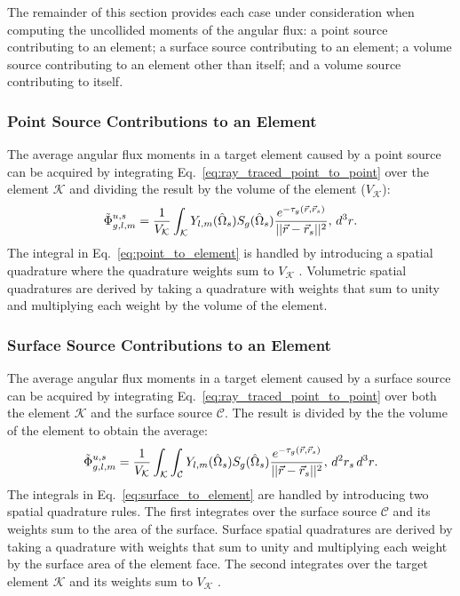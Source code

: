 The remainder of this section provides each case under consideration when computing the uncollided moments of the angular flux: a point source contributing to an element; a surface source contributing to an element; a volume source contributing to an element other than itself; and a volume source contributing to itself.

\subsubsection{Point Source Contributions to an Element}

The average angular flux moments in a target element caused by a point source can be acquired by integrating Eq.~\ref{eq:ray_traced_point_to_point} over the element $\mathcal{K}$ and dividing the result by the volume of the element ($V_{\mathcal{K}}$):
\begin{equation}\label{eq:point_to_element}
    \Tilde{\Phi}_{g,l,m}^{u, s} = \frac{1}{V_{\mathcal{K}}}\int_{\mathcal{K}}Y_{l,m}(\hat{\Omega}_{s})S_{g}(\hat{\Omega}_{s})\frac{e^{-\tau_{g}(\vec{r}, \vec{r}_{s})}}{||\vec{r} - \vec{r}_{s}||^{2}},\,d^{3}r\text{.}
\end{equation}
The integral in Eq.~\ref{eq:point_to_element} is handled by introducing a spatial quadrature where the quadrature weights sum to $V_{\mathcal{K}}$ \cite{harbour_uncollided}. Volumetric spatial quadratures are derived by taking a quadrature with weights that sum to unity and multiplying each weight by the volume of the element.

\subsubsection{Surface Source Contributions to an Element}

The average angular flux moments in a target element caused by a surface source can be acquired by integrating Eq.~\ref{eq:ray_traced_point_to_point} over both the element $\mathcal{K}$ and the surface source $\mathcal{C}$. The result is divided by the the volume of the element to obtain the average:
\begin{equation}\label{eq:surface_to_element}
    \Tilde{\Phi}_{g,l,m}^{u, s} = \frac{1}{V_{\mathcal{K}}}\int_{\mathcal{K}} \int_{\mathcal{C}} Y_{l,m}(\hat{\Omega}_{s})S_{g}(\hat{\Omega}_{s})\frac{e^{-\tau_{g}(\vec{r}, \vec{r}_{s})}}{||\vec{r} - \vec{r}_{s}||^{2}},\,d^{2}r_{s}\,d^{3}r\text{.}
\end{equation}
The integrals in Eq.~\ref{eq:surface_to_element} are handled by introducing two spatial quadrature rules. The first integrates over the surface source $\mathcal{C}$ and its weights sum to the area of the surface. Surface spatial quadratures are derived by taking a quadrature with weights that sum to unity and multiplying each weight by the surface area of the element face. The second integrates over the target element $\mathcal{K}$ and its weights sum to $V_{\mathcal{K}}$ \cite{harbour_uncollided}.

